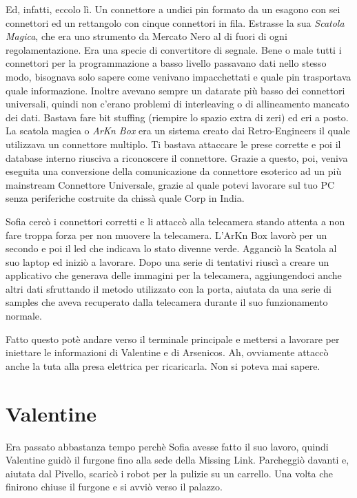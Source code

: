     Ed, infatti, eccolo lì. Un connettore a undici pin formato da un esagono con sei connettori ed un rettangolo con
    cinque connettori in fila. Estrasse la sua \emph{Scatola Magica}, che era uno strumento da Mercato Nero al di fuori
    di ogni regolamentazione. Era una specie di convertitore di segnale. Bene o male tutti i connettori per la
    programmazione a basso livello passavano dati nello stesso modo, bisognava solo sapere come venivano impacchettati e
    quale pin trasportava quale informazione. Inoltre avevano sempre un datarate più basso dei connettori universali,
    quindi non c'erano problemi di interleaving o di allineamento mancato dei dati. Bastava fare bit stuffing (riempire
    lo spazio extra di zeri) ed eri a posto. La scatola magica o \emph{ArKn Box} era un sistema creato dai
    Retro-Engineers il quale utilizzava un connettore multiplo. Ti bastava attaccare le prese corrette e poi il database
    interno riusciva a riconoscere il connettore. Grazie a questo, poi, veniva eseguita una conversione della
    comunicazione da connettore esoterico ad un più mainstream Connettore Universale, grazie al quale potevi lavorare
    sul tuo PC senza periferiche costruite da chissà quale Corp in India.

    Sofia cercò i connettori corretti e li attaccò alla telecamera stando attenta a non fare troppa forza per non
    muovere la telecamera. L'ArKn Box lavorò per un secondo e poi il led che indicava lo stato divenne verde. Agganciò
    la Scatola al suo laptop ed iniziò a lavorare. Dopo una serie di tentativi riuscì a creare un applicativo che
    generava delle immagini per la telecamera, aggiungendoci anche altri dati sfruttando il metodo utilizzato con la
    porta, aiutata da una serie di samples che aveva recuperato dalla telecamera durante il suo funzionamento normale.

    Fatto questo potè andare verso il terminale principale e mettersi a lavorare per iniettare le informazioni di
    Valentine e di Arsenicos. Ah, ovviamente attaccò anche la tuta alla presa elettrica per ricaricarla. Non si poteva
    mai sapere.

  \section*{Valentine}

    Era passato abbastanza tempo perchè Sofia avesse fatto il suo lavoro, quindi Valentine guidò il furgone fino alla
    sede della Missing Link. Parcheggiò davanti e, aiutata dal Pivello, scaricò i robot per la pulizie su un carrello.
    Una volta che finirono chiuse il furgone e si avviò verso il palazzo.

